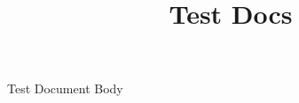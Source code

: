 \documentclass{report}
\begin{document}
\title{Test Docs}
\maketitle

Test Document Body
\end{document}
